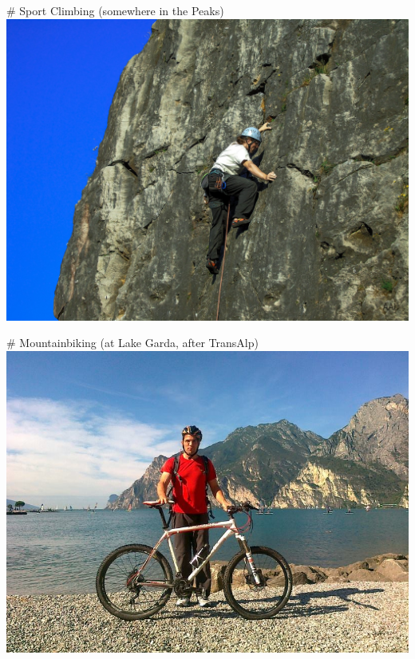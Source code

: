 \documentclass[fleqn]{beamer}
\begin{document}
# Sport Climbing (somewhere in the Peaks)
  \includegraphics[height=\textheight]{sportclimbing.jpg}

# Mountainbiking (at Lake Garda, after TransAlp)
  \includegraphics[height=\textheight]{mtb.jpg}
\end{document}
